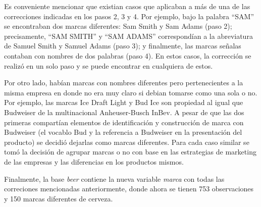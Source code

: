 \documentclass[
]{article}
\begin{document}
Es conveniente mencionar que existian casos que aplicaban a más de una
de las correcciones indicadas en los pasos 2, 3 y 4. Por ejemplo, bajo
la palabra ``SAM'' se encontraban dos marcas diferentes: Sam Smith y Sam
Adams (paso 2); precisamente, ``SAM SMITH'' y ``SAM ADAMS''
correspondían a la abreviatura de Samuel Smith y Samuel Adams (paso 3);
y finalmente, las marcas señalas contaban con nombres de dos palabras
(paso 4). En estos casos, la corrección se realizó en un solo paso y se
puede encontrar en cualquiera de estos.

Por otro lado, habían marcas con nombres diferentes pero pertenecientes
a la misma empresa en donde no era muy claro si debian tomarse como una
sola o no. Por ejemplo, las marcas Ice Draft Light y Bud Ice son
propiedad al igual que Budweiser de la multinacional Anheuser-Busch
InBev. A pesar de que las dos primeras compartían elementos de
identificación y construcción de marca con Budweiser (el vocablo Bud y
la referencia a Budweiser en la presentación del producto) se decidió
dejarlas como marcas diferentes. Para cada caso similar se tomó la
decisión de agrupar marcas o no con base en las estrategias de marketing
de las empresas y las diferencias en los productos mismos.

Finalmente, la base \emph{beer} contiene la nueva variable \emph{marca}
con todas las correciones mencionadas anteriormente, donde ahora se
tienen 753 observaciones y 150 marcas diferentes de cerveza.
\end{document}
